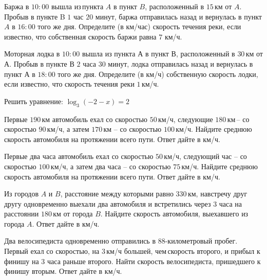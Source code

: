 \begin{class}[number=3]
\begin{listofex}
		\item Баржа в \( 10:00 \) вышла из пункта \( A \) в пункт \( B \), расположенный в \( 15 \) км от \( A \). Пробыв в пункте B \( 1 \) час \( 20 \) минут, баржа отправилась назад и вернулась в пункт \( A \) в \( 16:00 \) того же дня. Определите (в км/час) скорость течения реки, если известно, что собственная скорость баржи равна \( 7 \) км/ч.
		\item Моторная лодка в \( 10:00 \) вышла из пункта \( А \) в пункт \( В \), расположенный в \( 30 \) км от \( А \). Пробыв в пункте \( В \) \( 2 \) часа \( 30 \) минут, лодка отправилась назад и вернулась в пункт \( А \) в \( 18:00 \) того же дня. Определите (в км/ч) собственную скорость лодки, если известно, что скорость течения реки \( 1 \) км/ч.
	\end{listofex}
\end{class}

\begin{class}[number=4]
	\begin{listofex}
		\item 
	\end{listofex}
\end{class}

\begin{homework}[number=2]
	\begin{listofex}
		\item Решить уравнение: \quad \( \log_3(-2-x)=2 \)
		\item Первые \( 190 \) км автомобиль ехал со скоростью \( 50 \) км/ч, следующие \( 180 \) км -- со скоростью \( 90 \) км/ч, а затем \( 170 \) км -- со скоростью \( 100 \) км/ч. Найдите среднюю скорость автомобиля на протяжении всего пути. Ответ дайте в км/ч.
		\item Первые два часа автомобиль ехал со скоростью \( 50 \) км/ч, следующий час -- со скоростью \( 100 \) км/ч, а затем два часа -- со скоростью \( 75 \) км/ч. Найдите среднюю скорость автомобиля на протяжении всего пути. Ответ дайте в км/ч.
		\item Из городов \( A \) и \( B \), расстояние между которыми равно \( 330 \) км, навстречу друг другу одновременно выехали два автомобиля и встретились через \( 3 \) часа на расстоянии \( 180 \) км от города \( B \). Найдите скорость автомобиля, выехавшего из города \( A \). Ответ дайте в км/ч.
		\item Два велосипедиста одновременно отправились в \( 88 \)-километровый пробег. Первый ехал со скоростью, на \( 3 \) км/ч большей, чем скорость второго, и прибыл к финишу на \( 3 \) часа раньше второго. Найти скорость велосипедиста, пришедшего к финишу вторым. Ответ дайте в км/ч.
	\end{listofex}
\end{homework}


